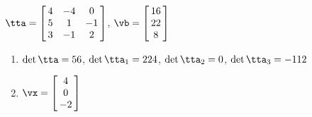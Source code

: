 {$\tta = \left[\hskip -3pt \begin{array}{ccc} 4&-4&0\\  5&1&-1
\\  3&-1&2\end{array}\hskip -3pt \right] $,
 \quad
$\vb = \left[\hskip -3pt \begin{array}{c} 16\\  22\\  
8\end{array}\hskip -3pt \right] $}
{\begin{enumerate}
\item	$\det{\tta} = 56$, $\det{\tta_1} = 224$, $\det{\tta_2} = 0$, $\det{\tta_3} = -112$
\item $\vx = \left[\hskip -3pt \begin{array}{c} 4\\  0\\  -2
\end{array}\hskip -3pt \right]$
\end{enumerate}
}


 

 

